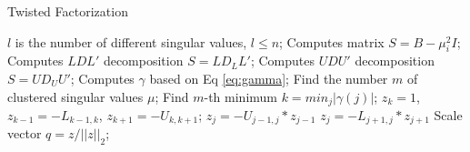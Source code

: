 \begin{algorithm}
\caption{Twisted Factorization}
\label{alg:twisted}
\begin{algorithmic}[1]
  \LineComment $l$ is the number of different singular values, $l\le n$;
    \State Computes matrix $S = B - \mu_i^2 I$;
    \State Computes $LDL'$ decomposition $S = LD_LL'$;
    \State Computes $UDU'$ decomposition $S = UD_UU'$;
    \State Computes $\gamma$ based on Eq \ref{eq:gamma};
    \State Find the number $m$ of clustered singular values $\mu$;
    \State Find $m$-th minimum $k = min_j  |\gamma(j)|$;
    \State $z_k = 1$, $z_{k-1} = -L_{k-1,k}$, $z_{k+1} = -U_{k,k+1}$;
      \State $z_j = -U_{j-1,j}*z_{j-1}$
    \EndFor
      \State $z_j = -L_{j+1,j}*z_{j+1}$
    \EndFor
    \State Scale vector $q = z/||z||_2$;
    \EndFor
  \EndFor
\EndProcedure
\end{algorithmic}
\end{algorithm}
